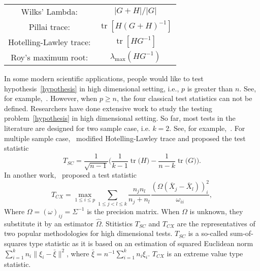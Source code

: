 \documentclass[12pt]{article} %
\DeclareMathOperator{\mytr}{tr}
\newcommand{\bX}{\mathbf{X}}
\theoremstyle{definition}
\begin{document}
       \begin{center}
       \begin{tabular}{|cc|}
           \hline
       {Wilks' Lambda:} & $|G+H|/|G|$\\
       {Pillai trace:} & $\mytr[H(G+H)^{-1}]$\\
       {Hotelling-Lawley trace:} & $\mytr[HG^{-1}]$\\
       {Roy's maximum root:} & $\lambda_{\max}(HG^{-1})$\\
           \hline
           \end{tabular}
       \end{center}



In some modern scientific applications, people would like to test hypothesis~\eqref{hypothesis} in high dimensional setting, i.e., $p$ is greater than $n$.
See, for example,~\cite{Tsai2009}.
However, when $p\geq n$, the four classical test statistics can not be defined.
  Researchers have done extensive work to study the testing problem~\eqref{hypothesis} in high dimensional setting.
 So far, most tests in the literature are designed for two sample case, i.e. $k=2$.
  See, for example,~\citet{Bai1996Efiect,Chen2010A,Srivastava2009A,Tony2013,Feng2015Multivariate}.
  For multiple sample case,~\cite{Schott2007Some} modified Hotelling-Lawley trace and proposed the test statistic
  $$
  T_{SC}=\frac{1}{\sqrt{n-1}}\Big(
  \frac{1}{k-1}\mytr\big(H\big)-\frac{1}{n-k}\mytr\big(G\big)
  \Big).
  $$
In another work,~\cite{Cai2014High} proposed a test statistic
  $$
  T_{CX}=\max_{1\leq i\leq p} \sum_{1\leq j<l\leq k}\frac{n_j n_l}{n_j+n_l}\frac{(\Omega(\bar{X}_j-\bar{X}_l))_i^2}{\omega_{ii}},
  $$
  Where $\Omega=(\omega)_{ij}=\Sigma^{-1}$ is the precision matrix. When $\Omega$ is unknown, they substitute it by an estimator $\hat{\Omega}$.
  Stitistics $T_{SC}$ and $T_{CX}$ are the representatives of two popular methodologies for high dimensional tests.
  $T_{SC}$ is a so-called sum-of-squares type statistic as it is based on an estimation of squared Euclidean norm $\sum_{i=1}^k n_i\|\xi_i-\bar{\xi}\|^2$, where $\bar{\xi}=n^{-1}\sum_{i=1}^k n_i \xi_i$.
  $T_{CX}$ is an extreme value type statistic.
  
\end{document}
